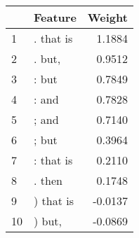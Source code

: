 \begin{tabular}{llr}
\toprule
{} &    Feature &  Weight \\
\midrule
1  &  . that is &  1.1884 \\
2  &     . but, &  0.9512 \\
3  &      : but &  0.7849 \\
4  &      : and &  0.7828 \\
5  &      ; and &  0.7140 \\
6  &      ; but &  0.3964 \\
7  &  : that is &  0.2110 \\
8  &     . then &  0.1748 \\
9  &  ) that is & -0.0137 \\
10 &     ) but, & -0.0869 \\
\bottomrule
\end{tabular}
